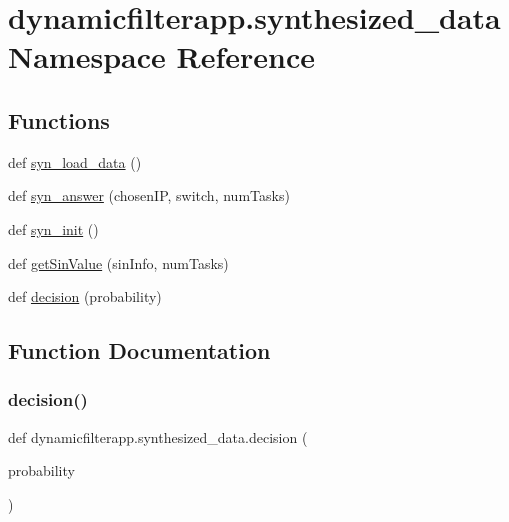 \hypertarget{namespacedynamicfilterapp_1_1synthesized__data}{}\section{dynamicfilterapp.\+synthesized\+\_\+data Namespace Reference}
\label{namespacedynamicfilterapp_1_1synthesized__data}
\subsection*{Functions}
\begin{DoxyCompactItemize}
\item 
def \hyperlink{namespacedynamicfilterapp_1_1synthesized__data_af2a5ccfeb2728fbcc461071a4755b1c9}{syn\+\_\+load\+\_\+data} ()
\item 
def \hyperlink{namespacedynamicfilterapp_1_1synthesized__data_a0e5fb46482e0da528e2f04b80ec56a16}{syn\+\_\+answer} (chosen\+IP, switch, num\+Tasks)
\item 
def \hyperlink{namespacedynamicfilterapp_1_1synthesized__data_aa39bcaa003257ebb92c9584885a3e39f}{syn\+\_\+init} ()
\item 
def \hyperlink{namespacedynamicfilterapp_1_1synthesized__data_a5a0a7234abf6b7bcefdfd576e9065d20}{get\+Sin\+Value} (sin\+Info, num\+Tasks)
\item 
def \hyperlink{namespacedynamicfilterapp_1_1synthesized__data_a72f48dd730b6717fb7657e3bc7705c2f}{decision} (probability)
\end{DoxyCompactItemize}


\subsection{Function Documentation}
\mbox{\label{namespacedynamicfilterapp_1_1synthesized__data_a72f48dd730b6717fb7657e3bc7705c2f}} 
\subsubsection{\texorpdfstring{decision()}{decision()}}
{\footnotesize\ttfamily def dynamicfilterapp.\+synthesized\+\_\+data.\+decision (\begin{DoxyParamCaption}\item[{}]{probability }\end{DoxyParamCaption})}

